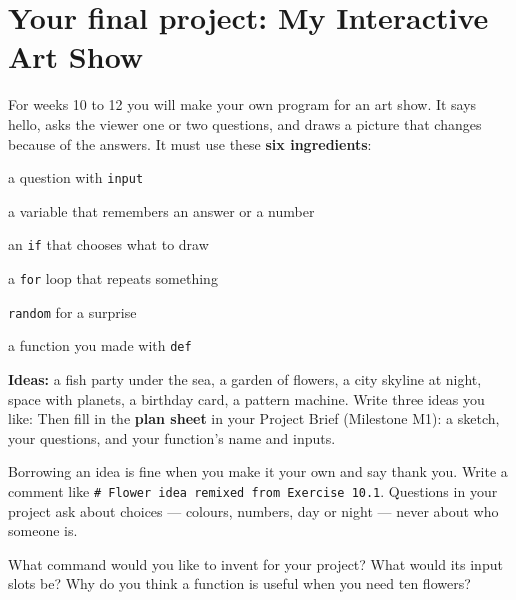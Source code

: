 \section{Your final project: My Interactive Art Show}
For weeks 10 to 12 you will make your own program for an art show. It says hello, asks the viewer one or two questions, and draws a picture that changes because of the answers. It must use these \textbf{six ingredients}:
\begin{checklist}
  \item a question with \texttt{input}
  \item a variable that remembers an answer or a number
  \item an \texttt{if} that chooses what to draw
  \item a \texttt{for} loop that repeats something
  \item \texttt{random} for a surprise
  \item a function you made with \texttt{def}
\end{checklist}
\textbf{Ideas:} a fish party under the sea, a garden of flowers, a city skyline at night, space with planets, a birthday card, a pattern machine. Write three ideas you like:
Then fill in the \textbf{plan sheet} in your Project Brief (Milestone M1): a sketch, your questions, and your function's name and inputs.

\begin{tip}
Borrowing an idea is fine when you make it your own and say thank you. Write a comment like \texttt{\# Flower idea remixed from Exercise 10.1}. Questions in your project ask about choices --- colours, numbers, day or night --- never about who someone is.
\end{tip}

\begin{vocab}
\end{vocab}

\begin{reflection}
What command would you like to invent for your project? What would its input slots be?
Why do you think a function is useful when you need ten flowers?
\end{reflection}
